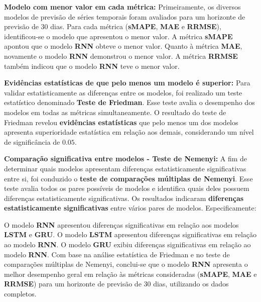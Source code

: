 \noindent\textbf{Modelo com menor valor em cada métrica:}	
Primeiramente, os diversos modelos de previsão de séries temporais foram avaliados para um horizonte de previsão de 30 dias. Para cada métrica (\textbf{sMAPE}, \textbf{MAE} e \textbf{RRMSE}), identificou-se o modelo que apresentou o menor valor.
A métrica \textbf{sMAPE} apontou que o modelo \textbf{RNN} obteve o menor valor.
Quanto à métrica \textbf{MAE}, novamente o modelo \textbf{RNN} demonstrou o menor valor.
A métrica \textbf{RRMSE} também indicou que o modelo \textbf{RNN} teve o menor valor.


\noindent\textbf{Evidências estatísticas de que pelo menos um modelo é superior:}
Para validar estatisticamente as diferenças entre os modelos, foi realizado um teste estatístico denominado \textbf{Teste de Friedman}. Esse teste avalia o desempenho dos modelos em todas as métricas simultaneamente. O resultado do teste de Friedman revelou \textbf{evidências estatísticas} que pelo menos um dos modelos apresenta superioridade estatística em relação aos demais, considerando um nível de significância de $0.05$.
	
\noindent\textbf{Comparação significativa entre modelos - Teste de Nemenyi:}	
A fim de determinar quais modelos apresentam diferenças estatisticamente significativas entre si, foi conduzido o \textbf{teste de comparações múltiplas de Nemenyi}. Esse teste avalia todos os pares possíveis de modelos e identifica quais deles possuem diferenças estatisticamente significativas. Os resultados indicaram \textbf{diferenças estatisticamente significativas} entre vários pares de modelos. Especificamente:

O modelo \textbf{RNN} apresentou diferenças significativas em relação aos modelos \textbf{LSTM} e \textbf{GRU}.
O modelo \textbf{LSTM} apresentou diferenças significativas em relação ao modelo \textbf{RNN}.
O modelo \textbf{GRU} exibiu diferenças significativas em relação ao modelo \textbf{RNN}.
Com base na análise estatística de Friedman e no teste de comparações múltiplas de Nemenyi, conclui-se que o modelo \textbf{RNN} apresenta o melhor desempenho geral em relação às métricas consideradas (\textbf{sMAPE}, \textbf{MAE} e \textbf{RRMSE}) para um horizonte de previsão de 30 dias, utilizando os dados completos.


